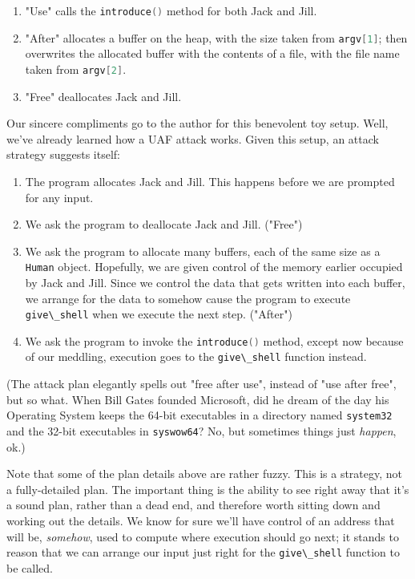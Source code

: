 \documentclass{article}
\newcommand{\xcode}[2]{\colorbox{ubuntuback}{\lstinline[language=#1]|#2|}}
\begin{document}
\begin{enumerate}
    \item "Use" calls the \xcode{C}{introduce()} method for both Jack and Jill.
    \item "After" allocates a buffer on the heap, with the size taken from \xcode{C}{argv[1]}; then overwrites the allocated buffer with the contents of a file, with the file name taken from \xcode{C}{argv[2]}.
    \item "Free" deallocates Jack and Jill.
\end{enumerate}

Our sincere compliments go to the author for this benevolent toy setup. Well, we've already learned how a UAF attack works. Given this setup, an attack strategy suggests itself:

\begin{enumerate}
    \item The program allocates Jack and Jill. This happens before we are prompted for any input.
    \item We ask the program to deallocate Jack and Jill. ("Free")
    \item We ask the program to allocate many buffers, each of the same size as a \xcode{C}{Human} object. Hopefully, we are given control of the memory earlier occupied by Jack and Jill. Since we control the data that gets written into each buffer, we arrange for the data to somehow cause the program to execute \xcode{C}{give\_shell} when we execute the next step. ("After")
    \item We ask the program to invoke the \xcode{C}{introduce()} method, except now because of our meddling, execution goes to the \xcode{C}{give\_shell} function instead. 
\end{enumerate}

(The attack plan elegantly spells out "free after use", instead of "use after free", but so what. When Bill Gates founded Microsoft, did he dream of the day his Operating System keeps the 64-bit executables in a directory named \xcode{C}{system32} and the 32-bit executables in \xcode{C}{syswow64}? No, but sometimes things just \textit{happen}, ok.)

Note that some of the plan details above are rather fuzzy. This is a strategy, not a fully-detailed plan. The important thing is the ability to see right away that it's a sound plan, rather than a dead end, and therefore worth sitting down and working out the details. We know for sure we'll have control of an address that will be, \textit{somehow}, used to compute where execution should go next; it stands to reason that we can arrange our input just right for the \xcode{C}{give\_shell} function to be called.
\end{document}
